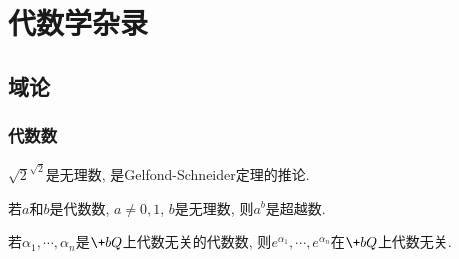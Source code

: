 \documentclass[hidelinks]{ctexart}
\begin{document}
\section{代数学杂录} %
\label{sec:代数学杂录}

\subsection{域论} %
\label{sub:域论}

\subsubsection{代数数} %
\label{ssub:代数数}

\begin{ex}
    $\sqrt{2}^{\sqrt{2}}$是无理数, 是Gelfond-Schneider定理的推论.
\end{ex}
\begin{theorem}
    若$a$和$b$是代数数, $a\neq 0,1$, $b$是无理数, 则$a^b$是超越数.
\end{theorem}
\begin{theorem}
    若$\alpha_1,\cdots,\alpha_n$是$\+bQ$上代数无关的代数数, 则$e^{\alpha_1},\cdots,e^{\alpha_n}$在$\+bQ$上代数无关.
\end{theorem}



\end{document}
